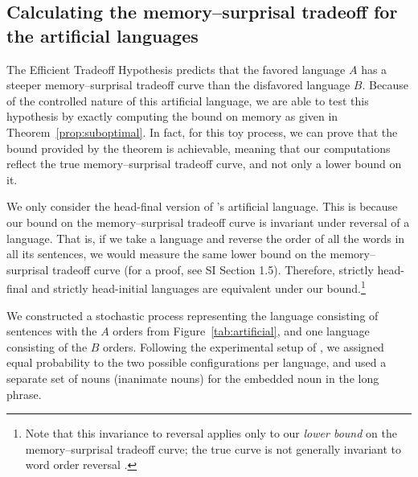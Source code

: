 \subsection{Calculating the memory--surprisal tradeoff for the artificial languages}

The Efficient Tradeoff Hypothesis predicts that the favored language $A$ has a steeper memory--surprisal tradeoff curve than the disfavored language $B$. Because of the controlled nature of this artificial language, we are able to test this hypothesis by exactly computing the bound on memory as given in Theorem~\ref{prop:suboptimal}. In fact, for this toy process, we can prove that the bound provided by the theorem is achievable, meaning that our computations reflect the true memory--surprisal tradeoff curve, and not only a lower bound on it.

We only consider the head-final version of \citet{fedzechkina-human-2017}'s artificial language. This is because our bound on the memory--surprisal tradeoff curve is invariant under reversal of a language. That is, if we take a language and reverse the order of all the words in all its sentences, we would measure the same lower bound on the memory--surprisal tradeoff curve (for a proof, see SI Section 1.5). Therefore, strictly head-final and strictly head-initial languages are equivalent under our bound.\footnote{Note that this invariance to reversal applies only to our \emph{lower bound} on the memory--surprisal tradeoff curve; the true curve is not generally invariant to word order reversal \citep{crutchfield-times-2009}.} 


We constructed a stochastic process representing the language consisting of sentences with the $A$ orders from Figure~\ref{tab:artificial}, and one language consisting of the $B$ orders. Following the experimental setup of \cite{fedzechkina-human-2017}, we assigned equal probability to the two possible configurations per language, and used a separate set of nouns (inanimate nouns) for the embedded noun in the long phrase.

